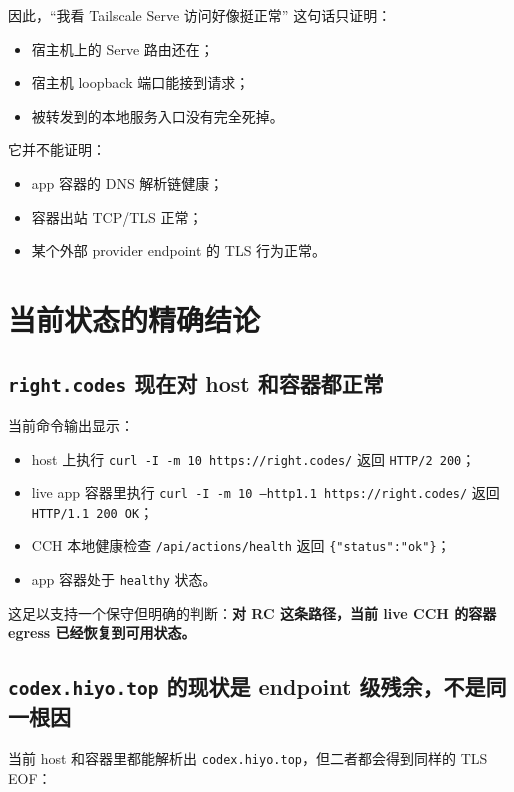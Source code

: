 \documentclass[a4paper]{article}
\begin{document}
因此，``我看 Tailscale Serve 访问好像挺正常'' 这句话只证明：

\begin{itemize}
\item 宿主机上的 Serve 路由还在；
\item 宿主机 loopback 端口能接到请求；
\item 被转发到的本地服务入口没有完全死掉。
\end{itemize}

它并不能证明：

\begin{itemize}
\item app 容器的 DNS 解析链健康；
\item 容器出站 TCP/TLS 正常；
\item 某个外部 provider endpoint 的 TLS 行为正常。
\end{itemize}

\section{当前状态的精确结论}

\subsection{\texttt{right.codes} 现在对 host 和容器都正常}

当前命令输出显示：

\begin{itemize}
\item host 上执行 \texttt{curl -I -m 10 https://right.codes/} 返回 \texttt{HTTP/2 200}；
\item live app 容器里执行 \texttt{curl -I -m 10 --http1.1 https://right.codes/} 返回 \texttt{HTTP/1.1 200 OK}；
\item CCH 本地健康检查 \texttt{/api/actions/health} 返回 \texttt{\{"status":"ok"\}}；
\item app 容器处于 \texttt{healthy} 状态。
\end{itemize}

这足以支持一个保守但明确的判断：\textbf{对 RC 这条路径，当前 live CCH 的容器 egress 已经恢复到可用状态。}

\subsection{\texttt{codex.hiyo.top} 的现状是 endpoint 级残余，不是同一根因}

当前 host 和容器里都能解析出 \texttt{codex.hiyo.top}，但二者都会得到同样的 TLS EOF：
\end{document}
